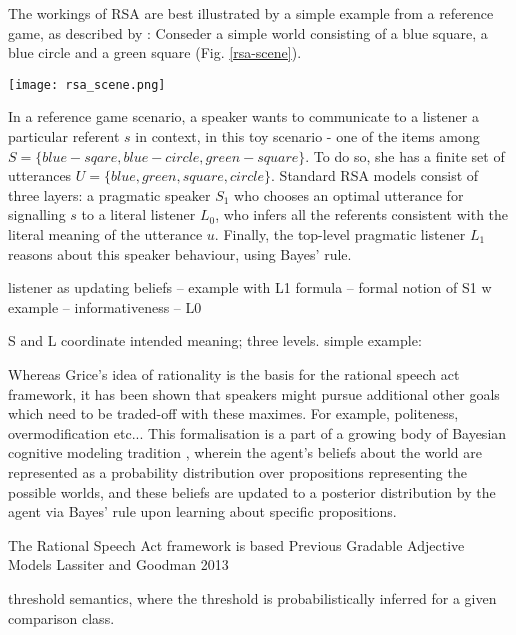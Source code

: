 The workings of RSA are best illustrated by a simple example from a reference game, as described by \textcite{frank2012predicting}:
Conseder a simple world consisting of a blue square, a blue circle and a green square (Fig. \ref{rsa-scene}).
\begin{figure*}[t]
	\begin{center}
		\texttt{[image: rsa\_scene.png]}
	\end{center}
	\vspace{-0.3cm}
	\caption{RSA reference resolution example scenario \parencite{frank2012predicting}}
	\label{rsa-scene}
\end{figure*}
In a reference game scenario, a speaker wants to communicate to a listener a particular referent $s$ in context, in this toy scenario - one of the items among $S = \{blue-sqare, blue-circle, green-square\}$. To do so, she has a finite set of utterances $U = \{blue, green, square, circle\}$. Standard RSA models consist of three layers: a pragmatic speaker $S_1$ who chooses an optimal utterance for signalling $s$ to a literal listener $L_0$, who infers all the referents consistent with the literal meaning of the utterance $u$. Finally, the top-level pragmatic listener $L_1$ reasons about this speaker behaviour, using Bayes' rule.  

listener as updating beliefs -- example with L1 formula -- formal notion of S1 w example -- informativeness -- L0 

S and L coordinate intended meaning; three levels. simple example: \parencite{goodman2016}

Whereas Grice’s idea of rationality is the basis for the rational speech act framework, it has been shown that speakers might pursue additional other goals which need to be traded-off with these maximes. For example, politeness, overmodification etc...  
This formalisation is a part of a growing body of Bayesian cognitive modeling tradition \parencite{tenenbaum2011grow}, wherein the agent’s beliefs about the world are represented as a probability distribution over propositions representing the possible worlds, and these beliefs are updated to a posterior distribution by the agent via Bayes’ rule upon learning about specific propositions. 

The Rational Speech Act framework is based 
Previous Gradable Adjective Models
Lassiter and Goodman 2013

threshold semantics, where the threshold is probabilistically inferred \parencite{lassiter2017adjectival} for a given comparison class.

